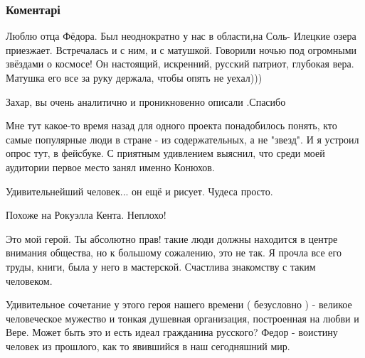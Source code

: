  
 
 
 
 
\subsubsection{Коментарі}

\begin{itemize} %

Люблю отца Фёдора. Был неоднократно у нас в области,на Соль- Илецкие озера
приезжает. Встречалась и с ним, и с матушкой. Говорили ночью под огромными
звёздами о космосе! Он настоящий, искренний, русский патриот, глубокая вера.
Матушка его все за руку держала, чтобы опять не уехал)))


Захар, вы очень аналитично и проникновенно описали .Спасибо


Мне тут какое-то время назад для одного проекта понадобилось понять, кто самые
популярные люди в стране - из содержательных, а не "звезд". И я устроил опрос
тут, в фейсбуке. С приятным удивлением выяснил, что среди моей аудитории первое
место занял именно Конюхов.



Удивительнейший человек... он ещё и рисует. Чудеса просто.


Похоже на Рокуэлла Кента. Неплохо!


Это мой герой. Ты абсолютно прав! такие люди должны находится в центре внимания
общества, но к большому сожалению, это не так. Я прочла все его труды, книги,
была у него в мастерской. Счастлива знакомству с таким человеком.


Удивительное сочетание у этого героя нашего времени ( безусловно ) - великое
человеческое мужество и тонкая душевная организация, построенная на любви и
Вере. Может быть это и есть идеал гражданина русского? Федор - воистину человек
из прошлого, как то явившийся в наш сегодняшний мир.


\end{itemize}
